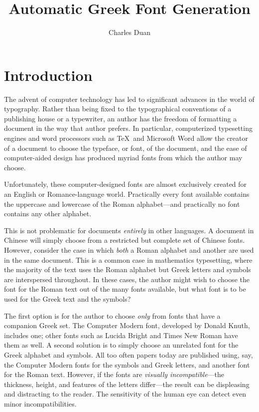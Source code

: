 \documentclass[12pt]{article}
\title{Automatic Greek Font Generation}
\author{Charles Duan \\ \switchemail{cduan@fas.harvard.edu}}
\begin{document}
\maketitle

\section{Introduction}

The advent of computer technology has led to significant advances in the world
of typography. Rather than being fixed to the typographical conventions of a
publishing house or a typewriter, an author has the freedom of formatting a
document in the way that author prefers. In particular, computerized typesetting
engines and word processors such as \TeX\ and Microsoft Word allow the creator
of a document to choose the typeface, or font, of the document, and the ease of
computer-aided design has produced myriad fonts from which the author may
choose.

Unfortunately, these computer-designed fonts are almost exclusively created for
an English or Romance-language world. Practically every font available contains
the uppercase and lowercase of the Roman alphabet---and practically no font
contains any other alphabet.

This is not problematic for documents \emph{entirely} in other languages. A
document in Chinese will simply choose from a restricted but complete set of
Chinese fonts. However, consider the case in which \emph{both} a Roman alphabet
and another are used in the same document. This is a common case in mathematics
typesetting, where the majority of the text uses the Roman alphabet but Greek
letters and symbols are interspersed throughout. In these cases, the author
might wish to choose the font for the Roman text out of the many fonts
available, but what font is to be used for the Greek text and the symbols?

The first option is for the author to choose \emph{only} from fonts that have a
companion Greek set. The Computer Modern font, developed by Donald Knuth,
includes one; other fonts such as Lucida Bright and Times New Roman have them as
well. A second solution is to simply choose an unrelated font for the Greek
alphabet and symbols. All too often papers today are published using, say, the
Computer Modern fonts for the symbols and Greek letters, and another font for
the Roman text. However, if the fonts are \emph{visually incompatible}---the
thickness, height, and features of the letters differ---the result can be
displeasing and distracting to the reader. The sensitivity of the human eye can
detect even minor incompatibilities.
\end{document}
